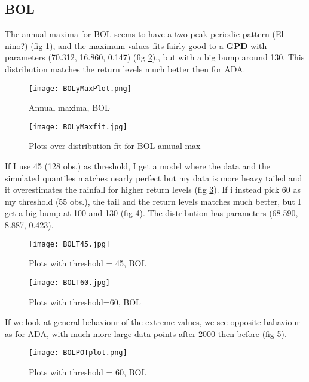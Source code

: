 \documentclass{article}
\begin{document}
 	\subsection{BOL}
 	The annual maxima for BOL seems to have a two-peak periodic pattern (El nino?) (fig \ref{BOLyMax}), and the maximum values fits fairly good to a \textbf{GPD} with parameters (70.312, 16.860, 0.147) (fig \ref{BOLyMfit})., but with a big bump around 130. This distribution matches the return levels much better then for ADA. 		\begin{figure}[H]
 		\centering
 		\texttt{[image: BOLyMaxPlot.png]}
 		\caption{Annual maxima, BOL}
 		\label{BOLyMax}
 	\end{figure}
 		\begin{figure}[H]
 		\centering
 		\texttt{[image: BOLyMaxfit.jpg]}
 		\caption{Plots over distribution fit for BOL anuual max}
 		\label{BOLyMfit}
 	\end{figure}
 	If I use 45 (128 obs.) as threshold, I get a model where the data and the simulated quantiles matches nearly perfect but my data is more heavy tailed and it overestimates the rainfall for higher return levels (fig \ref{BOLT45}). If i instead pick 60 as my threshold (55 obs.), the tail and the return levels matches much better, but I get a big bump at 100 and 130 (fig \ref{BOLT60}). The distribution has parameters (68.590, 8.887, 0.423).
 		\begin{figure}[H]
 		\centering
 		\texttt{[image: BOLT45.jpg]}
 		\caption{Plots with threshold = 45, BOL}
 		\label{BOLT45}
 	\end{figure}
 		\begin{figure}[H]
 		\centering
 		\texttt{[image: BOLT60.jpg]}
 		\caption{Plots with threshold=60, BOL}
 		\label{BOLT60}
 	\end{figure}
 	If we look at general behaviour of the extreme values, we see opposite bahaviour as for ADA, with much more large data points after 2000 then before (fig \ref{BOLPOT}).
 	\begin{figure}[H]
 		\centering
 		\texttt{[image: BOLPOTplot.png]}
 		\caption{Plots with threshold = 60, BOL}
 		\label{BOLPOT}
 	\end{figure}
\end{document}
